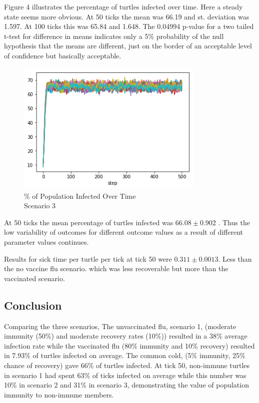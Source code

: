 \documentclass[11pt]{article} %
\begin{document}

Figure 4 illustrates the percentage of turtles infected over time. Here a steady state seems more obvious. At 50 ticks the mean was 66.19 and st. deviation was 1.597. At 100 ticks this was 65.84 and 1.648. The 0.04994 p-value for a two tailed t-test for difference in means indicates only a 5\% probability of the null hypothesis that the means are different, just on the border of an acceptable level of confidence but basically acceptable.

\begin{figure}
\centering
\includegraphics[width=0.8\textwidth]{20-runs-scenario-3-steady-state}
\caption{\% of Population Infected Over Time \\ Scenario 3}
\end{figure}


At 50 ticks the mean percentage of turtles infected was $66.08 \pm 0.902$ . Thus the low variability of outcomes for different outcome values as a result of different parameter values continues. 

Results for sick time per turtle per tick at tick 50 were $0.311 \pm 0.0013$. Less than the no vaccine flu scenario. which was less recoverable but more than the vaccinated scenario. 


\subsection{Conclusion}

Comparing the three scenarios, The unvaccinated flu, scenario 1, (moderate immunity (50\%) and moderate recovery rates (10\%)) resulted in a 38\% average infection rate while the vaccinated flu (80\% immunity and 10\% recovery) resulted in 7.93\% of turtles infected on average. The common cold, (5\% immunity, 25\% chance of recovery) gave 66\% of turtles infected. At tick 50, non-immune turtles in scenario 1 had spent 63\% of ticks infected on average while this number was  10\% in scenario 2 and 31\% in scenario 3, demonstrating the value of population immunity to non-immune members. 
\end{document}
